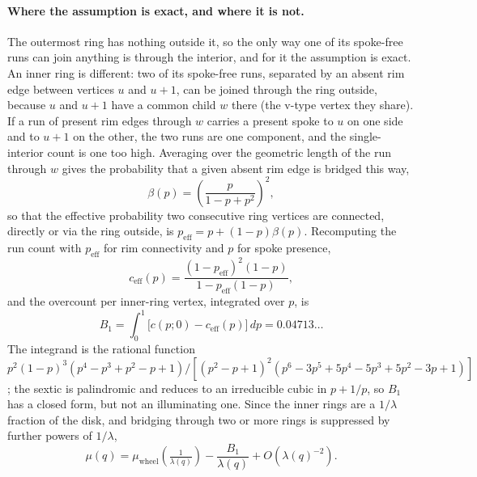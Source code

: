 \documentclass[11pt]{article}
\begin{document}
\paragraph{Where the assumption is exact, and where it is not.} The outermost ring has nothing outside it, so the only way one of its spoke-free runs can join anything is through the interior, and for it the assumption is exact. An inner ring is different: two of its spoke-free runs, separated by an absent rim edge between vertices $u$ and $u+1$, can be joined through the ring outside, because $u$ and $u+1$ have a common child $w$ there (the v-type vertex they share). If a run of present rim edges through $w$ carries a present spoke to $u$ on one side and to $u+1$ on the other, the two runs are one component, and the single-interior count is one too high. Averaging over the geometric length of the run through $w$ gives the probability that a given absent rim edge is bridged this way,
\begin{equation}
\beta(p) = \left(\frac{p}{1-p+p^2}\right)^2,
\label{eq:beta}
\end{equation}
so that the effective probability two consecutive ring vertices are connected, directly or via the ring outside, is $p_{\mathrm{eff}}=p+(1-p)\beta(p)$. Recomputing the run count with $p_{\mathrm{eff}}$ for rim connectivity and $p$ for spoke presence,
\[
c_{\mathrm{eff}}(p) = \frac{(1-p_{\mathrm{eff}})^2(1-p)}{1-p_{\mathrm{eff}}(1-p)},
\]
and the overcount per inner-ring vertex, integrated over $p$, is
\begin{equation}
B_1 = \int_0^1\big[c(p;0)-c_{\mathrm{eff}}(p)\big]\,dp = 0.04713\ldots
\label{eq:B1}
\end{equation}
The integrand is the rational function $p^2(1-p)^3(p^4-p^3+p^2-p+1)/[(p^2-p+1)^2(p^6-3p^5+5p^4-5p^3+5p^2-3p+1)]$; the sextic is palindromic and reduces to an irreducible cubic in $p+1/p$, so $B_1$ has a closed form, but not an illuminating one. Since the inner rings are a $1/\lambda$ fraction of the disk, and bridging through two or more rings is suppressed by further powers of $1/\lambda$,
\begin{equation}
\mu(q) = \mu_{\mathrm{wheel}}\!\left(\tfrac{1}{\lambda(q)}\right) - \frac{B_1}{\lambda(q)} + O\!\left(\lambda(q)^{-2}\right).
\label{eq:mu-derived}
\end{equation}
\end{document}

